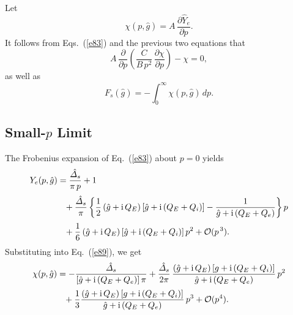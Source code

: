 \documentclass[12pt,prb,aps]{revtex4-1}
\begin{document}
Let 
\begin{equation}\label{e89}
\chi(p,\hat{g}) = A\,\frac{\partial \hat{Y}_e}{\partial p}.
\end{equation}
It follows from Eqs.~(\ref{e83}) and the previous two equations that
\begin{equation}\label{e90}
A\,\frac{\partial}{\partial p}\!\left(\frac{C}{B\,p^2}\,\frac{\partial\chi}{\partial p}\right) - \chi = 0,
\end{equation}
as well as
\begin{equation}\label{fdef}
F_s(\hat{g})= -\int_0^\infty \chi(p,\hat{g})\,dp.
\end{equation}

\subsection{Small-$p$ Limit}
The Frobenius expansion of Eq.~(\ref{e83}) about $p=0$ yields 
\begin{align}
Y_e(p,\hat{g}) &= \frac{\hat{\mit\Delta}_s}{\pi\,p} + 1
\nonumber\\[0.5ex]
&\phantom{=}+\frac{\hat{\mit\Delta}_s}{\pi}\left\{
\frac{1}{2}\,(\hat{g}+{\rm i}\,Q_E)\,[\hat{g}+{\rm i}\,(Q_E+Q_i)]-\frac{1}{\hat{g}+{\rm i}\,(Q_E+Q_e)}\right\}p\nonumber\\[0.5ex]
&\phantom{=} + \frac{1}{6}\,(\hat{g}+{\rm i}\,Q_E)\,[\hat{g}+{\rm i}\,(Q_E+Q_i)]\,p^2+{\cal O}(p^{\,3}).
\end{align}
Substituting into Eq.~(\ref{e89}), we get
\begin{align}\label{csmall}
\chi(p,\hat{g}) &= -\frac{\hat{\mit\Delta}_s}{[\hat{g}+{\rm i}\,(Q_E+Q_e)]\,\pi}+\frac{\hat{\mit\Delta}_s}{2\pi}\,\frac{(\hat{g}+{\rm i}\,Q_E)\,[g+{\rm i}\,(Q_E+Q_i)]}{\hat{g}+{\rm i}\,(Q_E+Q_e)}\,p^2\nonumber\\[0.5ex]
&\phantom{=} + \frac{1}{3} \frac{(\hat{g}+{\rm i}\,Q_E)\,[g+{\rm i}\,(Q_E+Q_i)]}{\hat{g}+{\rm i}\,(Q_E+Q_e)}\,p^3+{\cal O}(p^4).
\end{align}
\end{document}
